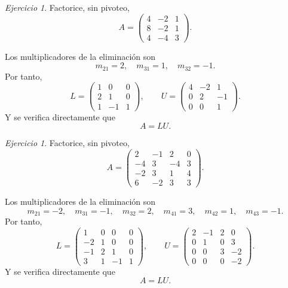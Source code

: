 \documentclass[12pt]{article}
\theoremstyle{remark}
\newtheorem{Ejer}[definicion]{Ejercicio}
\begin{document}
\begin{Ejer} Factorice, sin pivoteo,
\[
A=\begin{pmatrix}4 & -2 & 1\\8 & -2 & 1\\4 & -4 & 3\end{pmatrix}.
\]

Los multiplicadores de la eliminación son
\[
m_{21}=2,\quad m_{31}=1,\quad m_{32}=-1.
\]
Por tanto,
\[
L=\begin{pmatrix}1 & 0 & 0\\2 & 1 & 0\\1 & -1 & 1\end{pmatrix},\qquad U=\begin{pmatrix}4 & -2 & 1\\0 & 2 & -1\\0 & 0 & 1\end{pmatrix}.
\]
Y se verifica directamente que
\[
\boxed{A=LU}.
\]
\end{Ejer}
\begin{Ejer}

Factorice, sin pivoteo,
\[
A=\begin{pmatrix}2 & -1 & 2 & 0\\-4 & 3 & -4 & 3\\-2 & 3 & 1 & 4\\6 & -2 & 3 & 3\end{pmatrix}.
\]

Los multiplicadores de la eliminación son
\[
m_{21}=-2,\quad m_{31}=-1,\quad m_{32}=2,\quad m_{41}=3,\quad m_{42}=1,\quad m_{43}=-1.
\]
Por tanto,
\[
L=\begin{pmatrix}1 & 0 & 0 & 0\\-2 & 1 & 0 & 0\\-1 & 2 & 1 & 0\\3 & 1 & -1 & 1\end{pmatrix},\qquad U=\begin{pmatrix}2 & -1 & 2 & 0\\0 & 1 & 0 & 3\\0 & 0 & 3 & -2\\0 & 0 & 0 & -2\end{pmatrix}.
\]
Y se verifica directamente que
\[
\boxed{A=LU}.
\]
\end{Ejer}
\end{document}
